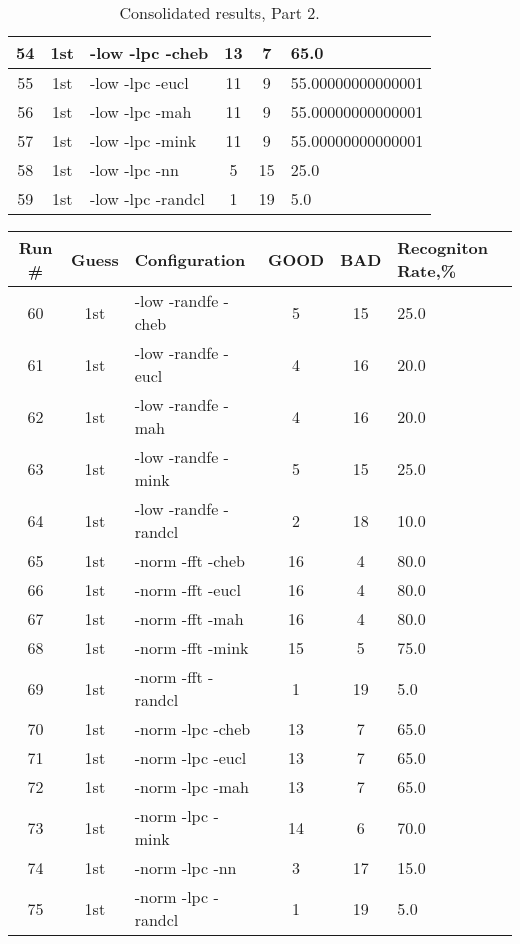 \begin{table}
\begin{tabular}{|c|c|l|c|c|l|}
54 & 1st & -low -lpc -cheb & 13 & 7 & 65.0\\ \hline
55 & 1st & -low -lpc -eucl & 11 & 9 & 55.00000000000001\\ \hline
56 & 1st & -low -lpc -mah & 11 & 9 & 55.00000000000001\\ \hline
57 & 1st & -low -lpc -mink & 11 & 9 & 55.00000000000001\\ \hline
58 & 1st & -low -lpc -nn & 5 & 15 & 25.0\\ \hline
59 & 1st & -low -lpc -randcl & 1 & 19 & 5.0\\ \hline
\end{tabular}
\caption{Consolidated results, Part 2.}
\label{tab:results}
\end{table}

\begin{table}
\centering
\begin{tabular}{|c|c|l|c|c|l|} \hline
Run \# & Guess & Configuration & GOOD & BAD & Recogniton Rate,\%\\ \hline\hline
60 & 1st & -low -randfe -cheb & 5 & 15 & 25.0\\ \hline
61 & 1st & -low -randfe -eucl & 4 & 16 & 20.0\\ \hline
62 & 1st & -low -randfe -mah & 4 & 16 & 20.0\\ \hline
63 & 1st & -low -randfe -mink & 5 & 15 & 25.0\\ \hline
64 & 1st & -low -randfe -randcl & 2 & 18 & 10.0\\ \hline
65 & 1st & -norm -fft -cheb & 16 & 4 & 80.0\\ \hline
66 & 1st & -norm -fft -eucl & 16 & 4 & 80.0\\ \hline
67 & 1st & -norm -fft -mah & 16 & 4 & 80.0\\ \hline
68 & 1st & -norm -fft -mink & 15 & 5 & 75.0\\ \hline
69 & 1st & -norm -fft -randcl & 1 & 19 & 5.0\\ \hline
70 & 1st & -norm -lpc -cheb & 13 & 7 & 65.0\\ \hline
71 & 1st & -norm -lpc -eucl & 13 & 7 & 65.0\\ \hline
72 & 1st & -norm -lpc -mah & 13 & 7 & 65.0\\ \hline
73 & 1st & -norm -lpc -mink & 14 & 6 & 70.0\\ \hline
74 & 1st & -norm -lpc -nn & 3 & 17 & 15.0\\ \hline
75 & 1st & -norm -lpc -randcl & 1 & 19 & 5.0\\ \hline

\end{tabular}
\end{table}
